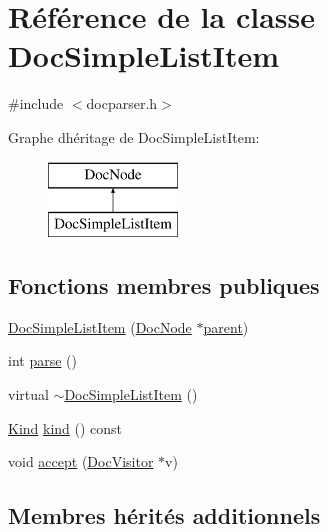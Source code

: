 \hypertarget{class_doc_simple_list_item}{}\section{Référence de la classe Doc\+Simple\+List\+Item}
\label{class_doc_simple_list_item}


{\ttfamily \#include $<$docparser.\+h$>$}

Graphe d\textquotesingle{}héritage de Doc\+Simple\+List\+Item\+:\begin{figure}[H]
\begin{center}
\leavevmode
\includegraphics[height=2.000000cm]{class_doc_simple_list_item}
\end{center}
\end{figure}
\subsection*{Fonctions membres publiques}
\begin{DoxyCompactItemize}
\item 
\hyperlink{class_doc_simple_list_item_a4f94bf7f0685a2cb3e8fc2a88099e6be}{Doc\+Simple\+List\+Item} (\hyperlink{class_doc_node}{Doc\+Node} $\ast$\hyperlink{class_doc_node_a990d8b983962776a647e6231d38bd329}{parent})
\item 
int \hyperlink{class_doc_simple_list_item_a040ca2df33767ae455642894b4193591}{parse} ()
\item 
virtual \hyperlink{class_doc_simple_list_item_a92601a5d396e40fb67f695f246b73560}{$\sim$\+Doc\+Simple\+List\+Item} ()
\item 
\hyperlink{class_doc_node_aebd16e89ca590d84cbd40543ea5faadb}{Kind} \hyperlink{class_doc_simple_list_item_a0a4b7c196769a7249753b90edc55d379}{kind} () const 
\item 
void \hyperlink{class_doc_simple_list_item_a977fe7d09d43c8bad1f91ddeac6f37f3}{accept} (\hyperlink{class_doc_visitor}{Doc\+Visitor} $\ast$v)
\end{DoxyCompactItemize}
\subsection*{Membres hérités additionnels}


